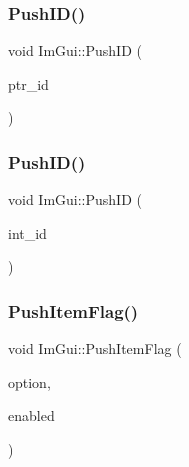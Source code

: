 \hypertarget{namespace_im_gui_af9cf42fdf2fbc5eeec7521de14996bfb}{}\label{namespace_im_gui_af9cf42fdf2fbc5eeec7521de14996bfb} 
\subsubsection{\texorpdfstring{Push\+I\+D()}{PushID()}\hspace{0.1cm}{\footnotesize\ttfamily [3/4]}}
{\footnotesize\ttfamily void Im\+Gui\+::\+Push\+ID (\begin{DoxyParamCaption}\item[{const void $\ast$}]{ptr\+\_\+id }\end{DoxyParamCaption})}

\hypertarget{namespace_im_gui_a6a11664be2a0b9a0e7054bb339e009ac}{}\label{namespace_im_gui_a6a11664be2a0b9a0e7054bb339e009ac} 
\subsubsection{\texorpdfstring{Push\+I\+D()}{PushID()}\hspace{0.1cm}{\footnotesize\ttfamily [4/4]}}
{\footnotesize\ttfamily void Im\+Gui\+::\+Push\+ID (\begin{DoxyParamCaption}\item[{int}]{int\+\_\+id }\end{DoxyParamCaption})}

\hypertarget{namespace_im_gui_ac7301f6378333f6d17f47823eed9e00a}{}\label{namespace_im_gui_ac7301f6378333f6d17f47823eed9e00a} 
\subsubsection{\texorpdfstring{Push\+Item\+Flag()}{PushItemFlag()}}
{\footnotesize\ttfamily void Im\+Gui\+::\+Push\+Item\+Flag (\begin{DoxyParamCaption}\item[{Im\+Gui\+Item\+Flags}]{option,  }\item[{bool}]{enabled }\end{DoxyParamCaption})}

\hypertarget{namespace_im_gui_a4ad13bf38f0521a339133248ef3e3036}{}\label{namespace_im_gui_a4ad13bf38f0521a339133248ef3e3036} 
